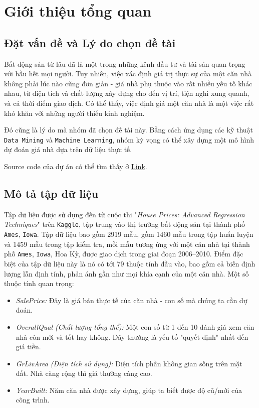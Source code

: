\section{Giới thiệu tổng quan}
\subsection{Đặt vấn đề và Lý do chọn đề tài}
Bất động sản từ lâu đã là một trong những kênh đầu tư và tài sản quan trọng với hầu hết mọi người. Tuy nhiên, việc xác định giá trị thực sự của một căn nhà không phải lúc nào cũng đơn giản - giá nhà phụ thuộc vào rất nhiều yếu tố khác nhau, từ diện tích và chất lượng xây dựng cho đến vị trí, tiện nghi xung quanh, và cả thời điểm giao dịch. Có thể thấy, việc định giá một căn nhà là một việc rất khó khăn với những người thiếu kinh nghiệm.\medskip

Đó cũng là lý do mà nhóm đã chọn đề tài này. Bằng cách ứng dụng các kỹ thuật \texttt{Data Mining} và \texttt{Machine Learning}, nhóm kỳ vọng có thể xây dựng một mô hình dự đoán giá nhà dựa trên dữ liệu thực tế.\medskip

Source code của dự án có thể tìm thấy ở \href{https://github.com/nxhhoang/CO3029-Data-mining-house-prices-advanced-regression}{Link}.
\subsection{Mô tả tập dữ liệu}
Tập dữ liệu được sử dụng đến từ cuộc thi "\textit{House Prices: Advanced Regression Techniques}" trên \texttt{Kaggle}, tập trung vào thị trường bất động sản tại thành phố \texttt{Ames}, \texttt{Iowa}. Tập dữ liệu bao gồm 2919 mẫu, gồm 1460 mẫu trong tập huấn luyện và 1459 mẫu trong tập kiểm tra, mỗi mẫu tương ứng với một căn nhà tại thành phố \texttt{Ames}, \texttt{Iowa}, Hoa Kỳ, được giao dịch trong giai đoạn 2006–2010. Điểm đặc biệt của tập dữ liệu này là nó có tới 79 thuộc tính đầu vào, bao gồm cả biến định lượng lẫn định tính, phản ánh gần như mọi khía cạnh của một căn nhà. Một số thuộc tính quan trọng:
\begin{itemize}
\item[-] \textit{SalePrice:} Đây là giá bán thực tế của căn nhà - con số mà chúng ta cần dự đoán.
\item[-] \textit{OverallQual (Chất lượng tổng thể):} Một con số từ 1 đến 10 đánh giá xem căn nhà còn mới và tốt hay không. Đây thường là yếu tố "quyết định" nhất đến giá tiền.
\item[-] \textit{GrLivArea (Diện tích sử dụng):} Diện tích phần không gian sống trên mặt đất. Nhà càng rộng thì giá thường càng cao.
\item[-] \textit{YearBuilt:} Năm căn nhà được xây dựng, giúp ta biết được độ cũ/mới của công trình.
\end{itemize}

